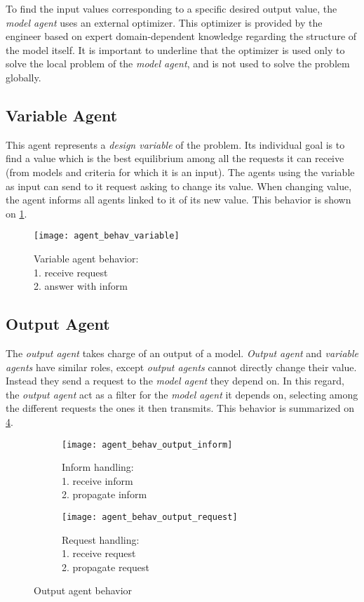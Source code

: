 To find the input values corresponding to a specific desired output value, the \emph{model agent} uses an external optimizer. This optimizer is provided by the engineer based on expert domain-dependent knowledge regarding the structure of the model itself.
It is important to underline that the optimizer is used only to solve the local problem of the \emph{model agent}, and is not used to solve the problem globally.

\subsection{Variable Agent}

This agent represents a \emph{design variable} of the problem. Its individual goal is to find a value which is the best equilibrium among all the requests it can receive (from models and criteria for which it is an input). The agents using the variable as input can send to it request asking to change its value. When changing value, the agent informs all agents linked to it of its new value. This behavior is shown on \figurename{} \ref{agent_behav_variable}. 

\begin{figure}
\centering
\texttt{[image: agent\_behav\_variable]}
\caption{Variable agent behavior:\\1. receive request\\2. answer with inform}\label{agent_behav_variable}
\end{figure}

\subsection{Output Agent}
The \emph{output agent} takes charge of an output of a model. \emph{Output agent} and \emph{variable agents} have similar roles, except \emph{output agents} cannot directly change their value. Instead they send a request to the \emph{model agent} they depend on. In this regard, the \emph{output agent} act as a filter for the \emph{model agent} it depends on, selecting among the different requests the ones it then transmits. This behavior is summarized on \figurename{} \ref{agent_behav_output}.

\begin{figure}
\centering
\begin{subfigure}{0.25\textwidth}
		\centering
		\texttt{[image: agent\_behav\_output\_inform]}
		\caption{Inform handling:\\1. receive inform\\2. propagate inform}\label{agent_behav_output:inf}
\end{subfigure}
\qquad
\begin{subfigure}{0.25\textwidth}
		\centering
		\texttt{[image: agent\_behav\_output\_request]}
		\caption{Request handling:\\1. receive request\\2. propagate request}\label{agent_behav_output:req}
\end{subfigure}
\caption{Output agent behavior}\label{agent_behav_output}
\end{figure}

